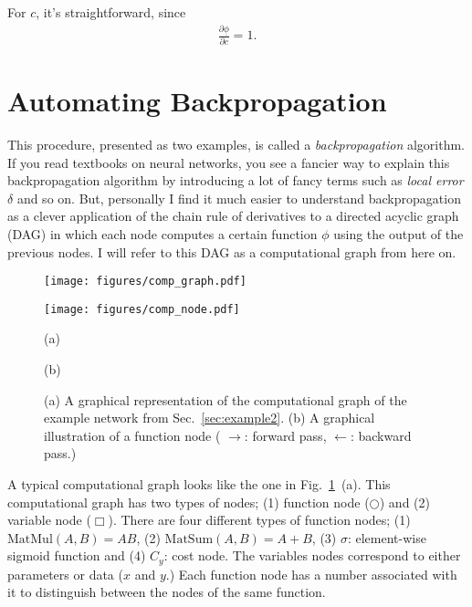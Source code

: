 \documentclass{report}
\begin{document}
For $c$, it's straightforward, since 
\begin{align*}
    \frac{\partial \underline{\phi}}{\partial c} = 1.
\end{align*}


\section{Automating Backpropagation}
\label{sec:autodiff}

This procedure, presented as two examples, is called a {\em backpropagation}
algorithm. If you read textbooks on neural networks, you see a fancier way to
explain this backpropagation algorithm by introducing a lot of fancy terms such
as {\em local error} $\delta$ and so on. But, personally I find it much easier
to understand backpropagation as a clever application of the chain rule of
derivatives to a directed acyclic graph (DAG) in which each node computes a certain
function $\phi$ using the output of the previous nodes. I will refer to this
DAG as a computational graph from here on.

\begin{figure}[ht]
    \centering
    \begin{minipage}{0.48\textwidth}
        \centering
        \texttt{[image: figures/comp\_graph.pdf]}
    \end{minipage}
    \hfill
    \begin{minipage}{0.48\textwidth}
        \centering
        \texttt{[image: figures/comp\_node.pdf]}
    \end{minipage}

    \begin{minipage}{0.48\textwidth}
        \centering
        (a)
    \end{minipage}
    \hfill
    \begin{minipage}{0.48\textwidth}
        \centering
        (b)
    \end{minipage}
    \caption{(a) A graphical representation of the computational graph of the
    example network from Sec.~\ref{sec:example2}. (b) A graphical illustration
    of a function node ({\color{blue} $\to$}: forward pass, {\color{red}
$\leftarrow$}: backward pass.)}
    \label{fig:comp_graph}
\end{figure}

A typical computational graph looks like the one in Fig.~\ref{fig:comp_graph}~(a).
This computational graph has two types of nodes; (1) function node ($\bigcirc$)
and (2) variable node ($\Box$). There are four different types of function
nodes; (1) $\text{MatMul}(A,B) = AB$, (2) $\text{MatSum}(A,B)=A+B$, (3)
$\sigma$: element-wise sigmoid function  and (4) $C_y$: cost node. The variables
nodes correspond to either parameters or data ($x$ and $y$.) Each function node
has a number associated with it to distinguish between the nodes of the same
function.
\end{document}
